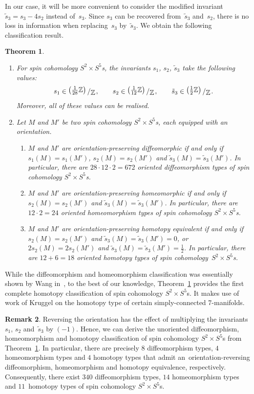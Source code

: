 \documentclass[pdftex]{sigma}
\numberwithin{equation}{section}
\newtheorem{Theorem}{Theorem}[section]
\theoremstyle{definition}
\newtheorem{Remark}[Theorem]{Remark}
\numberwithin{table}{section}
\newcommand{\Z}{\mathbb{Z}}
\newcommand{\bigslant}[2]{{\raisebox{.2em}{$#1$}\left/\raisebox{-.2em}{$#2$}\right.}}
\begin{document}
In our case, it will be more convenient to consider the modified invariant $\tilde{s}_3=s_3-4s_2$ instead of~$s_3$. Since $s_3$ can be recovered from~$\tilde{s}_3$ and~$s_2$, there is no loss in information when replacing~$s_3$ by~$\tilde{s}_3$. We obtain the following classification result.
\begin{Theorem}\label{T:class}\qquad
	\begin{enumerate}\itemsep=0pt
		\item[$(1)$] For spin cohomology $S^2\times S^5$s, the invariants $s_1$, $s_2$, $\tilde{s}_3$ take the following values:
		\[  s_1\in \bigslant{\bigl(\tfrac{1}{28}\Z\bigr)}{\Z}, \qquad s_2\in \bigslant{\bigl(\tfrac{1}{12}\Z\bigr)}{\Z}, \qquad \tilde{s}_3\in \bigslant{\bigl(\tfrac{1}{2}\Z\bigr)}{\Z}. \]
		Moreover, all of these values can be realised.
		\item[$(2)$] Let $M$ and $M'$ be two spin cohomology $S^2\times S^5$s, each equipped with an orientation.
		\begin{enumerate}\itemsep=0pt
			\item[$(a)$] $M$ and $M'$ are orientation-preserving diffeomorphic if and only if $s_1(M)=s_1(M')$, $s_2(M)=s_2(M')$ and $\tilde{s}_3(M)=\tilde{s}_3(M')$. In particular, there are $28\cdot 12\cdot 2=672$ oriented diffeomorphism types of spin cohomology $S^2\times S^5$s.
			\item[$(b)$] $M$ and $M'$ are orientation-preserving homeomorphic if and only if $s_2(M)=s_2(M')$ and $\tilde{s}_3(M)=\tilde{s}_3(M')$. In particular, there are $12\cdot 2=24$ oriented homeomorphism types of spin cohomology $S^2\times S^5$s.
			\item[$(c)$] $M$ and $M'$ are orientation-preserving homotopy equivalent if and only if $s_2(M)=s_2(M')$ and $\tilde{s}_3(M)=\tilde{s}_3(M')=0$, or $2s_2(M)=2s_2(M')$ and $\tilde{s}_3(M)=\tilde{s}_3(M')=\frac{1}{2}$. In particular, there are $12+6=18$ oriented homotopy types of spin cohomology~${S^2\times S^5}$s.
		\end{enumerate}
	\end{enumerate}
\end{Theorem}
While the diffeomorphism and homeomorphism classification was essentially shown by Wang in~\cite{Wa22}, to the best of our knowledge, Theorem~\ref{T:class} provides the first complete homotopy classification of spin cohomology $S^2\times S^5$s. It makes use of work of Kruggel \cite{Kr97,Kr98} on the homotopy type of certain simply-connected 7-manifolds.

\begin{Remark}\label{R:class_unor}
Reversing the orientation has the effect of multiplying the invariants $s_1$, $s_2$ and~$\tilde{s}_3$ by $(-1)$. Hence, we can derive the unoriented diffeomorphism, homeomorphism and homotopy classification of spin cohomology $S^2\times S^5$s from Theorem~\ref{T:class}. In particular, there are precisely $8$ diffeomorphism types, $4$ homeomorphism types and $4$ homotopy types that admit an~orientation-reversing diffeomorphism, homeomorphism and homotopy equivalence, respectively. Consequently, there exist $340$ diffeomorphism types, $14$ homeomorphism types and $11$~homotopy types of spin cohomology $S^2\times S^5$s.
\end{Remark}
\end{document}
